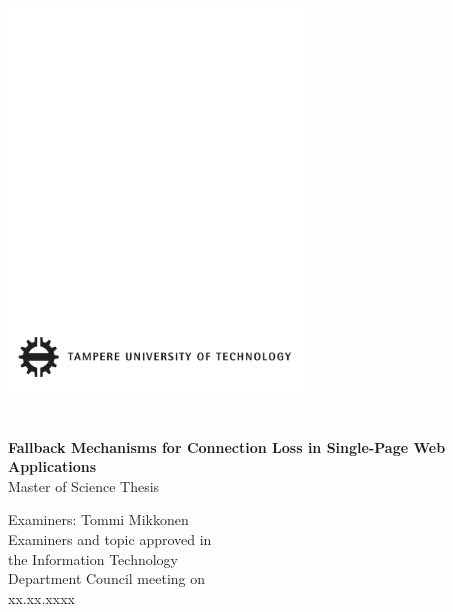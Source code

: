 \thispagestyle{empty}
 
\vspace*{-.5cm}\noindent
 
 
\includegraphics[width=8cm]{assets/tut-logo}
 
\vspace{6.8cm}
 
\\
{\bf\large \textsf{Fallback Mechanisms for Connection Loss in Single-Page Web Applications}}\\
\textsf{Master of Science Thesis}
 
\vspace{6.7cm} %
 
\begin{flushright}
  
\begin{minipage}[c]{6.8cm}
\begin{spacing}{1.0}
\textsf{Examiners: Tommi Mikkonen}\\
\textsf{Examiners and topic approved in}\\ 
\textsf{the Information Technology}\\
\textsf{Department Council meeting on}\\
\textsf{xx.xx.xxxx}\\
\end{spacing}
\end{minipage}
\end{flushright}



